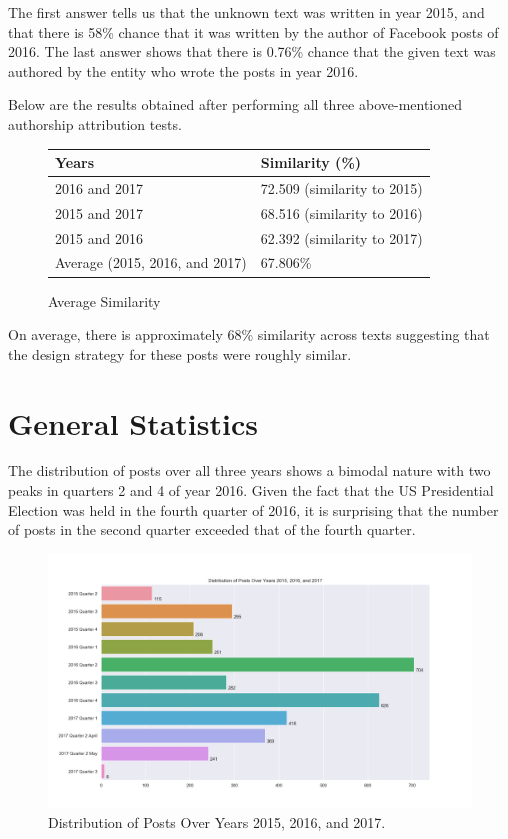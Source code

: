 \documentclass[12pt]{article}
\theoremstyle{definition}
\begin{document}
The first answer tells us that the unknown text was written in year 2015, and
that there is 58\% chance that it was written by the author of Facebook posts
of 2016. The last answer shows that there is 0.76\% chance that the given
text was authored by the entity who wrote the posts in year 2016.

\bigskip

Below are the results obtained after performing all three above-mentioned
authorship attribution tests.

\begin{figure}[H]
\centering
\begin{tabular}{|p{8cm}|p{8cm}|}
 \hline
 Years & Similarity (\%)\\
 \hline
 2016 and 2017 & 72.509 (similarity to 2015)\\
 \hline
 2015 and 2017 & 68.516 (similarity to 2016)\\
 \hline
 2015 and 2016 & 62.392 (similarity to 2017)\\
 \hline
 Average (2015, 2016, and 2017) & 67.806\%\\
 \hline
\end{tabular}
\caption*{Average Similarity}
\end{figure}

On average, there is approximately 68\% similarity across texts suggesting that
the design strategy for these posts were roughly similar.


\section*{\centering General Statistics}

The distribution of posts over all three years shows a bimodal nature with two
peaks in quarters 2 and 4 of year 2016. Given the fact that the US Presidential
Election was held in the fourth quarter of 2016, it is surprising that the
number of posts in the second quarter exceeded that of the fourth quarter.

\begin{figure}[H]
\centering
\includegraphics[width=0.75\columnwidth]{./image/barchart-plots/barchart_distribution_of_posts.png}
\caption*{Distribution of Posts Over Years 2015, 2016, and 2017.}
\end{figure}
\end{document}
